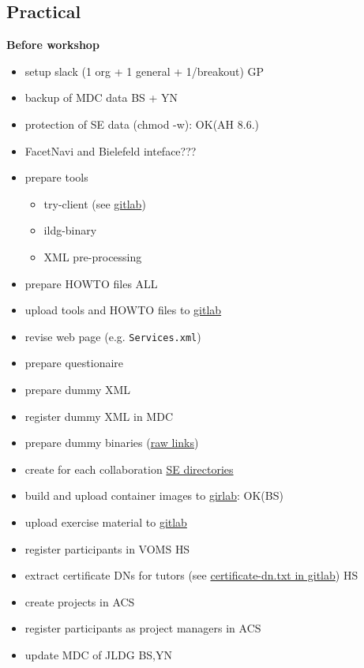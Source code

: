 \documentclass{article}
\begin{document}
\subsection{Practical}
{\bf Before workshop}
\begin{itemize}
    \item setup slack (1 org + 1 general + 1/breakout) \hfill{GP}
    \item backup of MDC data \hfill{BS + YN}
    \item protection of SE data (chmod -w): OK(AH 8.6.)
    \item FacetNavi and Bielefeld inteface???
    \item prepare tools
    \begin{itemize}
        \item try-client (see \href{https://gitlab.desy.de/ildg/hands-on/try-client}{gitlab})
        \item ildg-binary
        \item XML pre-processing
    \end{itemize}
    \item prepare HOWTO files \hfill ALL
    \item upload tools and HOWTO files to \href{https://gitlab.desy.de/ildg/hands-on/material}{gitlab}
    \item revise web page (e.g. {\tt Services.xml})
    \item prepare questionaire
    \item prepare dummy XML
    \item register dummy XML in MDC
    \item prepare dummy binaries (\href{srm://globe-door.ifh.de/pnfs/ifh.de/acs/grid/ildg/hands-on/test/hubert}{raw links})
    \item create for each collaboration \href{srm://globe-door.ifh.de/pnfs/ifh.de/acs/grid/ildg/hands-on}{SE directories}
    \item build and upload container images to \href{https://gitlab.desy.de/ildg/hands-on/workshop-image}{girlab}: OK(BS)
    \item upload exercise material to \href{https://gitlab.desy.de/ildg/hands-on/material}{gitlab}
    \item register participants in VOMS \hfill{HS}
    \item extract certificate DNs for tutors 
    (see \href{https://gitlab.desy.de/ildg/hands-on/material}{certificate-dn.txt in gitlab})     \hfill{HS}
    \item create projects in ACS
    \item register participants as project managers in ACS
    \item update MDC of JLDG \hfill{BS,YN}
\end{itemize}
\end{document}
